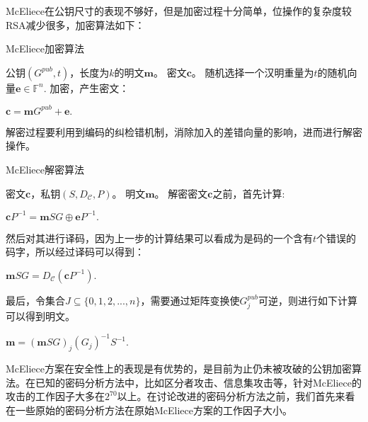 McEliece在公钥尺寸的表现不够好，但是加密过程十分简单，位操作的复杂度较RSA减少很多，加密算法如下：

\begin{breakablealgorithm}
	\small
	\renewcommand{\algorithmicrequire}{\textbf{Input:}}
	\renewcommand{\algorithmicensure}{\textbf{Output:}}
	\caption{McEliece加密算法}
	\label{alg:McElieceEn}
	\begin{algorithmic}[1]
		\Require
		公钥$(G^{pub},t)$，长度为$k$的明文$\mathbf{m}$。
		\Ensure
		密文$\mathbf{c}$。
		\State
		随机选择一个汉明重量为$t$的随机向量$\mathbf{e} \in \mathbb{F}^n$.
		\State
		加密，产生密文：
		
		\centering $\mathbf{c} = \mathbf{m}G^{pub} + \mathbf{e}.$
	\end{algorithmic}
\end{breakablealgorithm}

解密过程要利用到编码的纠检错机制，消除加入的差错向量的影响，进而进行解密操作。

\begin{breakablealgorithm}
	\small
	\renewcommand{\algorithmicrequire}{\textbf{Input:}}
	\renewcommand{\algorithmicensure}{\textbf{Output:}}
	\caption{McEliece解密算法}
	\label{alg:McElieceDe}
	\begin{algorithmic}[1]
		\Require
		密文$\mathbf{c}$，私钥$(S,D_\mathcal{C},P)$。
		\Ensure
		明文$\mathbf{m}$。
		\State
		解密密文$\mathbf{c}$之前，首先计算:
		\begin{center}
			$\mathbf{c}P^{-1} = \mathbf{m}SG \oplus\textbf{e}P^{-1}.$
		\end{center}

		\State
		然后对其进行译码，因为上一步的计算结果可以看成为是码的一个含有$t$个错误的码字，所以经过译码可以得到：
		\begin{center}
			$\mathbf{m}SG = D_\mathcal{C}(\mathbf{c}P^{-1}).$
		\end{center}
		
		\State
		最后，令集合$J \subseteq \{0,1,2,...,n\}$，需要通过矩阵变换使$G_j^{pub}$可逆，则进行如下计算可以得到明文。
		\begin{center}
			$\mathbf{m} = (\mathbf{m}SG)_j(G_j)^{-1}S^{-1}.$
		\end{center}		
	\end{algorithmic}
\end{breakablealgorithm}

McEliece方案在安全性上的表现是有优势的，是目前为止仍未被攻破的公钥加密算法。在已知的密码分析方法中，比如区分者攻击、信息集攻击等，针对McEliece的攻击的工作因子大多在$2^{70}$以上。在讨论改进的密码分析方法之前，我们首先来看在一些原始的密码分析方法在原始McEliece方案的工作因子大小。

